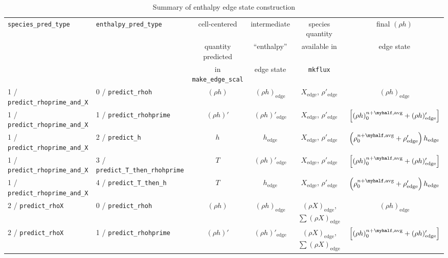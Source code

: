 \begin{landscape}
\begin{table}[t]
\caption{Summary of enthalpy edge state construction}
\label{table:pred:hoverview}
\renewcommand{\arraystretch}{1.5}
{\small
\centering
\begin{tabular}{l|l|c|c|c|c}
\hline
\hline
{\tt species\_pred\_type} &   
{\tt enthalpy\_pred\_type} &
{cell-centered} &
{intermediate} &
{species quantity} &
{final $(\rho h)$} \\[-5pt]
 &
 &
{quantity predicted} &
{``enthalpy''} &
{available in} &
{edge state} \\[-5pt]
 &
 &
{in {\tt make\_edge\_scal}} &
{edge state} &
{\tt mkflux} &
 \\
\hline 
1 / {\tt predict\_rhoprime\_and\_X}  & 0 / {\tt predict\_rhoh} &
  $(\rho h)$ & $(\rho h)_\mathrm{edge}$ & 
  $X_\mathrm{edge}$, $\rho'_\mathrm{edge}$ & 
  $(\rho h)_\mathrm{edge}$ \\
1 / {\tt predict\_rhoprime\_and\_X}  & 1 / {\tt predict\_rhohprime} &
  $(\rho h)'$ & $(\rho h)'_\mathrm{edge}$ & 
  $X_\mathrm{edge}$, $\rho'_\mathrm{edge}$ & 
  $\left [ (\rho h)_0^{n+\myhalf,{\rm avg}} + (\rho h)'_\mathrm{edge} \right ]$ \\
1 / {\tt predict\_rhoprime\_and\_X}  & 2 / {\tt predict\_h} &
  $h$ & $h_\mathrm{edge}$ & 
  $X_\mathrm{edge}$, $\rho'_\mathrm{edge}$ & 
  $\left ( \rho_0^{n+\myhalf,{\rm avg}} + \rho'_\mathrm{edge} \right ) h_\mathrm{edge}$ \\
1 / {\tt predict\_rhoprime\_and\_X}  & 3 / {\tt predict\_T\_then\_rhohprime} &
  $T$ & $(\rho h)'_\mathrm{edge}$ & 
  $X_\mathrm{edge}$, $\rho'_\mathrm{edge}$ & 
  $\left [ (\rho h)_0^{n+\myhalf,{\rm avg}} + (\rho h)'_\mathrm{edge} \right ]$ \\
1 / {\tt predict\_rhoprime\_and\_X}  & 4 / {\tt predict\_T\_then\_h} &
  $T$ & $h_\mathrm{edge}$ & 
  $X_\mathrm{edge}$, $\rho'_\mathrm{edge}$ & 
  $\left ( \rho_0^{n+\myhalf,{\rm avg}} + \rho'_\mathrm{edge} \right ) h_\mathrm{edge}$ \\
\hline
\hline
2 / {\tt predict\_rhoX}  & 0 / {\tt predict\_rhoh} &
  $(\rho h)$ & $(\rho h)_\mathrm{edge}$ & 
  $(\rho X)_\mathrm{edge}$, $\sum(\rho X)_\mathrm{edge}$ & 
  $(\rho h)_\mathrm{edge}$ \\
2 / {\tt predict\_rhoX}  & 1 / {\tt predict\_rhohprime} &
  $(\rho h)'$ & $(\rho h)'_\mathrm{edge}$ & 
  $(\rho X)_\mathrm{edge}$, $\sum(\rho X)_\mathrm{edge}$ & 
  $\left [ (\rho h)_0^{n+\myhalf,{\rm avg}} + (\rho h)'_\mathrm{edge} \right ]$ \\

\end{tabular}}
\end{table}
\end{landscape}
